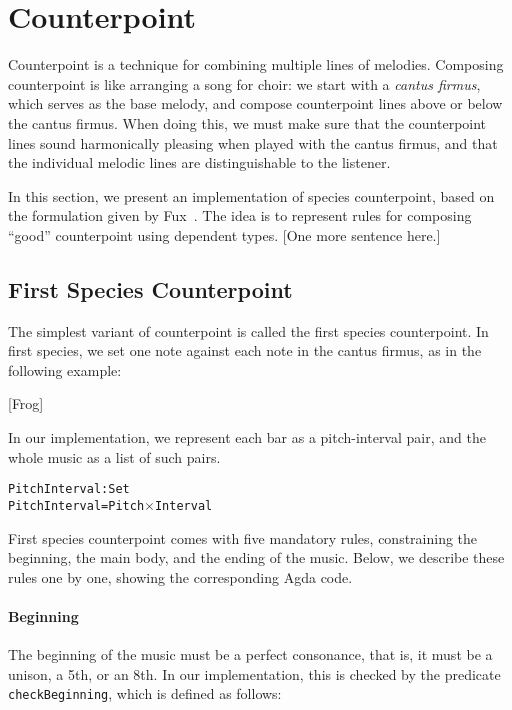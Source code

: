 \section{Counterpoint}
\label{sec:cp}

Counterpoint is a technique for combining multiple lines of melodies.
Composing counterpoint is like arranging a song for choir:
we start with a \emph{cantus firmus}, which serves as the base melody,
and compose counterpoint lines above or below the cantus firmus.
When doing this, we must make sure that the counterpoint lines sound
harmonically pleasing when played with the cantus firmus,
and that the individual melodic lines are distinguishable to the listener.

In this section, we present an implementation of species counterpoint,
based on the formulation given by Fux~\citep{fux-cp}.
The idea is to represent rules for composing ``good'' counterpoint
using dependent types.
[One more sentence here.]

\subsection{First Species Counterpoint}
\label{sec:cp:fs}

The simplest variant of counterpoint is called the first species
counterpoint.
In first species, we set one note against each note in the cantus
firmus, as in the following example:

[Frog]

In our implementation, we represent each bar as a pitch-interval
pair, and the whole music as a list of such pairs.

\begin{alltt}
PitchInterval : Set
PitchInterval = Pitch \(\times\) Interval
\end{alltt}

First species counterpoint comes with five mandatory rules, 
constraining the beginning, the main body, and the ending of
the music.
Below, we describe these rules one by one, showing the
corresponding Agda code.

\paragraph{Beginning}
The beginning of the music must be a perfect consonance,
that is, it must be a unison, a 5th, or an 8th.
In our implementation, this is checked by the predicate
\texttt{checkBeginning}, which is defined as follows:

